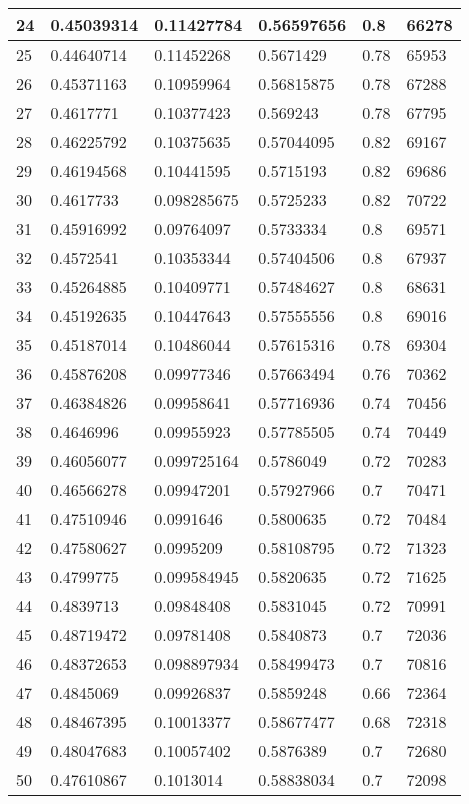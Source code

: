 \begin{longtable}{|l|l|l|l|l|l|}
24 & 0.45039314 & 0.11427784 & 0.56597656 & 0.8 & 66278 \\ \hline 
25 & 0.44640714 & 0.11452268 & 0.5671429 & 0.78 & 65953 \\ \hline 
26 & 0.45371163 & 0.10959964 & 0.56815875 & 0.78 & 67288 \\ \hline 
27 & 0.4617771 & 0.10377423 & 0.569243 & 0.78 & 67795 \\ \hline 
28 & 0.46225792 & 0.10375635 & 0.57044095 & 0.82 & 69167 \\ \hline 
29 & 0.46194568 & 0.10441595 & 0.5715193 & 0.82 & 69686 \\ \hline 
30 & 0.4617733 & 0.098285675 & 0.5725233 & 0.82 & 70722 \\ \hline 
31 & 0.45916992 & 0.09764097 & 0.5733334 & 0.8 & 69571 \\ \hline 
32 & 0.4572541 & 0.10353344 & 0.57404506 & 0.8 & 67937 \\ \hline 
33 & 0.45264885 & 0.10409771 & 0.57484627 & 0.8 & 68631 \\ \hline 
34 & 0.45192635 & 0.10447643 & 0.57555556 & 0.8 & 69016 \\ \hline 
35 & 0.45187014 & 0.10486044 & 0.57615316 & 0.78 & 69304 \\ \hline 
36 & 0.45876208 & 0.09977346 & 0.57663494 & 0.76 & 70362 \\ \hline 
37 & 0.46384826 & 0.09958641 & 0.57716936 & 0.74 & 70456 \\ \hline 
38 & 0.4646996 & 0.09955923 & 0.57785505 & 0.74 & 70449 \\ \hline 
39 & 0.46056077 & 0.099725164 & 0.5786049 & 0.72 & 70283 \\ \hline 
40 & 0.46566278 & 0.09947201 & 0.57927966 & 0.7 & 70471 \\ \hline 
41 & 0.47510946 & 0.0991646 & 0.5800635 & 0.72 & 70484 \\ \hline 
42 & 0.47580627 & 0.0995209 & 0.58108795 & 0.72 & 71323 \\ \hline 
43 & 0.4799775 & 0.099584945 & 0.5820635 & 0.72 & 71625 \\ \hline 
44 & 0.4839713 & 0.09848408 & 0.5831045 & 0.72 & 70991 \\ \hline 
45 & 0.48719472 & 0.09781408 & 0.5840873 & 0.7 & 72036 \\ \hline 
46 & 0.48372653 & 0.098897934 & 0.58499473 & 0.7 & 70816 \\ \hline 
47 & 0.4845069 & 0.09926837 & 0.5859248 & 0.66 & 72364 \\ \hline 
48 & 0.48467395 & 0.10013377 & 0.58677477 & 0.68 & 72318 \\ \hline 
49 & 0.48047683 & 0.10057402 & 0.5876389 & 0.7 & 72680 \\ \hline 
50 & 0.47610867 & 0.1013014 & 0.58838034 & 0.7 & 72098 \\ \hline 
\end{longtable}